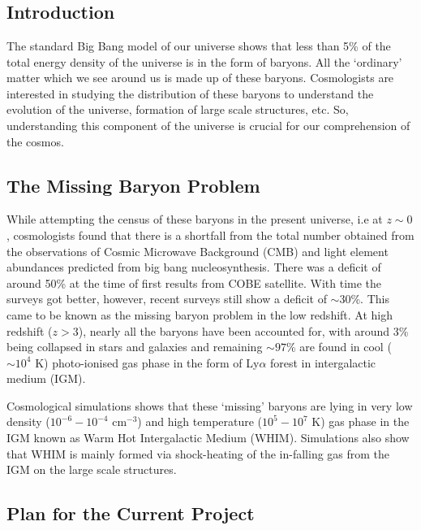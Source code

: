 \documentclass[12pt,oneside,noprintercorrection]{iut}
\begin{document}
\chapter*{}

\vspace*{-4cm}

\section*{Introduction}

The standard Big Bang model of our universe shows that less than 5\% of the total energy density of the universe is in the form of baryons. All the `ordinary' matter which we see around us is made up of these baryons. Cosmologists are interested in studying the distribution of these baryons to understand the evolution of the universe, formation of large scale structures, etc. So, understanding this component of the universe is crucial for our comprehension of the cosmos.

\section*{The Missing Baryon Problem}

While attempting the census of these baryons in the present universe, i.e at $z \sim 0$, cosmologists found that there is a shortfall from the total number obtained from the observations of Cosmic Microwave Background (CMB) and light element abundances predicted from big bang nucleosynthesis. There was a deficit of around 50\% at the time of first results from COBE satellite. With time the surveys got better, however, recent surveys still show a deficit of $\sim 30$\%. This came to be known as the missing baryon problem in the low redshift. At high redshift ($z>3$), nearly all the baryons have been accounted for, with around 3\% being collapsed in stars and galaxies and remaining $\sim97$\% are found in cool ($\sim10^4$ K) photo-ionised gas phase in the form of Ly$\alpha$ forest in intergalactic medium (IGM).  

\citet{Bahcall-1969}

Cosmological simulations shows that these `missing' baryons are lying in very low density ($10^{-6}-10^{-4}$ cm$^{-3}$) and high temperature ($10^5-10^7$ K) gas phase in the IGM known as Warm Hot Intergalactic Medium (WHIM). Simulations also show that WHIM is mainly formed via shock-heating of the in-falling gas from the IGM on the large scale structures.
\section*{Plan for the Current Project}
\end{document}
